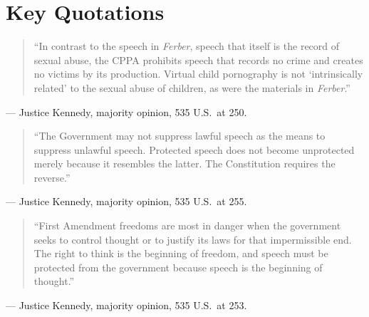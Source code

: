 \documentclass[12pt]{article}
\begin{document}
\section{Key Quotations}

\begin{quote}
``In contrast to the speech in \textit{Ferber}, speech that itself is the record of sexual abuse, the CPPA prohibits speech that records no crime and creates no victims by its production. Virtual child pornography is not `intrinsically related' to the sexual abuse of children, as were the materials in \textit{Ferber}.''
\end{quote}
\noindent --- Justice Kennedy, majority opinion, 535 U.S.\ at 250.

\begin{quote}
``The Government may not suppress lawful speech as the means to suppress unlawful speech. Protected speech does not become unprotected merely because it resembles the latter. The Constitution requires the reverse.''
\end{quote}
\noindent --- Justice Kennedy, majority opinion, 535 U.S.\ at 255.

\begin{quote}
``First Amendment freedoms are most in danger when the government seeks to control thought or to justify its laws for that impermissible end. The right to think is the beginning of freedom, and speech must be protected from the government because speech is the beginning of thought.''
\end{quote}
\noindent --- Justice Kennedy, majority opinion, 535 U.S.\ at 253.
\end{document}
